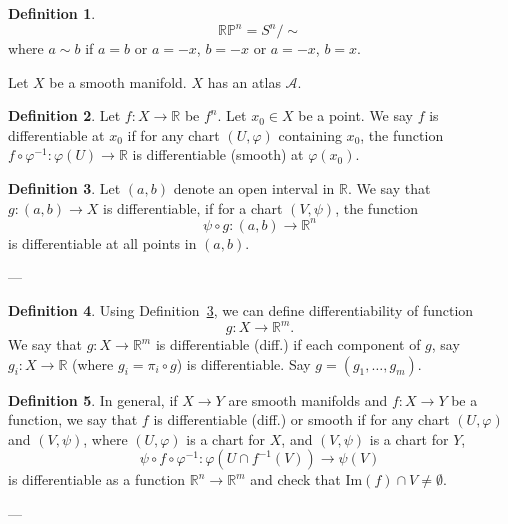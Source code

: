 \documentclass[11pt]{article}
\theoremstyle{definition}
\newtheorem{definition}{Definition}[section]
\theoremstyle{remark}
\begin{document}
\begin{definition}\label{def:rp_quotient}
\[
\mathbb{RP}^n = S^n / \sim
\]
where $a \sim b$ if $a = b$ or $a = -x$, $b = -x$ or $a = -x$, $b = x$.
\end{definition}

Let $X$ be a smooth manifold. $X$ has an atlas $\mathcal{A}$.

\begin{definition}\label{def:smooth_function_point}
    Let $f \colon X \to \mathbb{R}$ be $f^n$. Let $x_0 \in X$ be a point. We say $f$ is differentiable at $x_0$ if for any chart $(U, \varphi)$ containing $x_0$, the function $f \circ \varphi^{-1} \colon \varphi(U) \to \mathbb{R}$ is differentiable (smooth) at $\varphi(x_0)$.
\end{definition}

\begin{definition}\label{def:smooth_function_curve}
    Let $(a, b)$ denote an open interval in $\mathbb{R}$. We say that $g \colon (a, b) \to X$ is differentiable, if for a chart $(V, \psi)$, the function
    \[
    \psi \circ g \colon (a, b) \to \mathbb{R}^n
    \]
    is differentiable at all points in $(a, b)$.
\end{definition}

---
\begin{definition}\label{def:differentiability_function}
Using Definition~\ref{def:smooth_function_curve}, we can define differentiability of function
\[ g: X \to \mathbb{R}^m. \]
We say that $g: X \to \mathbb{R}^m$ is differentiable (diff.)
if each component of $g$, say $g_i: X \to \mathbb{R}$ (where $g_i = \pi_i \circ g$) is differentiable.
Say $g = (g_1, \dots, g_m)$.
\end{definition}

\begin{definition}\label{def:smooth_map_manifolds}
In general, if $X \to Y$ are smooth manifolds and $f: X \to Y$ be a function, we say that $f$ is differentiable (diff.) or smooth if for any chart $(U, \varphi)$ and $(V, \psi)$, where $(U, \varphi)$ is a chart for $X$, and $(V, \psi)$ is a chart for $Y$,
\[
\psi \circ f \circ \varphi^{-1} : \varphi(U \cap f^{-1}(V)) \to \psi(V)
\]
is differentiable as a function $\mathbb{R}^n \to \mathbb{R}^m$ and check that $\text{Im}(f) \cap V \neq \emptyset$.
\end{definition}
---
\end{document}
